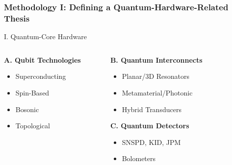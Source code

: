 \documentclass[aspectratio=169]{beamer}
\begin{document}

\begin{frame}[fragile]
    \frametitle{Methodology I: Defining a Quantum-Hardware-Related Thesis}

    \begin{block}{I. Quantum-Core Hardware}
    \footnotesize
    \begin{columns}[T,totalwidth=\textwidth]
        \begin{column}{0.33\textwidth}
            \textbf{A. Qubit Technologies}
            \begin{itemize}
                \item Superconducting
                \item Spin-Based
                \item Bosonic
                \item Topological
            \end{itemize}
            \vspace{1em}
        \end{column}
        \begin{column}{0.33\textwidth}
            \textbf{B. Quantum Interconnects}
            \begin{itemize}
                \item Planar/3D Resonators
                \item Metamaterial/Photonic
                \item Hybrid Transducers
            \end{itemize}
            \vspace{1em}
            \textbf{C. Quantum Detectors}
            \begin{itemize}
                \item SNSPD, KID, JPM
                \item Bolometers
            \end{itemize}
        \end{column}
        \begin{column}{0.33\textwidth}

\end{column}
\end{columns}
\end{block}
\end{frame}
\end{document}
